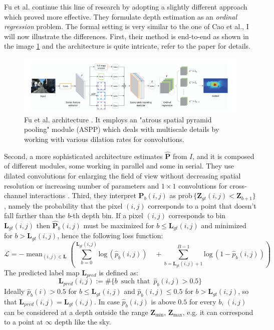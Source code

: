 Fu et al. \cite{ordinal_regression} continue this line of research by adopting a slightly different approach which proved more effective.
They formulate depth estimation as an \textit{ordinal regression} problem.
The formal setting is very similar to the one of Cao et al., I will now illustrate the differences.
First, their method is end-to-end as shown in the image \ref{fig:Fu_ordinal} and the architecture is quite intricate, refer to the paper \cite{ordinal_regression} for details.

\begin{figure}
	\centering
	\includegraphics[scale=0.5]{figs/Fu_ordinal}
	\caption{Fu et al. architecture \cite{ordinal_regression}. It employs an "atrous spatial pyramid pooling" module (ASPP) which deals with multiscale details by working with various dilation rates for convolutions. \label{fig:Fu_ordinal}}
\end{figure}

Second, a more sophisticated architecture estimates $\hat{\mathbf{P}}$ from $I$, and it is composed of different modules, some working in parallel and some in serial.
They use dilated convolutions for enlarging the field of view without decreasing spatial resolution or increasing number of parameters \cite{ordinal_regression} and $1 \times 1$ convolutions for cross-channel interactions \cite{ordinal_regression}.
Third, they interpret $\mathbf{P}_{b}(i,j)$ as $\text{prob} \, \{ \mathbf{Z}_{gt}(i,j) < \mathbf{Z}_{b+1} \}$, namely the probability that the pixel $(i,j)$ corresponds to a point that doesn't fall farther than the $b$-th depth bin.
If a pixel $(i,j)$ corresponds to bin $\mathbf{L}_{gt}(i,j)$ then $\hat{\mathbf{P}}_{b}(i,j)$ must be maximized for $b \leq \mathbf{L}_{gt}(i,j)$ and minimized for $b > \mathbf{L}_{gt}(i,j)$, hence the following loss function:
\[
	\mathcal{L} = - \mathop{\text{mean}}_{(i,j) \in \mathbf{L}} \left(
		\sum_{b=0}^{\mathbf{L}_{gt}(i,j)} \text{log} \,( \hat{p}_{b}(i,j)) \quad +
		\sum_{b=\mathbf{L}_{gt}(i,j) + 1}^{B-1} \text{log} \, (1 - \hat{p}_{b}(i,j))
		\right)
\]
The predicted label map $\mathbf{L}_{pred}$ is defined as:
\[
	\mathbf{L}_{pred}(i,j) := \# \{b \, \text{ such that } \, \hat{p}_{b}(i,j) > 0.5\}
\]
Ideally $\hat{p}_{b}(i) > 0.5$ for $b \leq \mathbf{L}_{gt}(i,j)$ and $\hat{p}_{b}(i,j) \leq 0.5$ for $b > \mathbf{L}_{gt}(i,j)$, so that $\mathbf{L}_{pred}(i,j) = \mathbf{L}_{gt}(i,j)$.
In case $\hat{p}_{b}(i,j)$ is above $0.5$ for every $b$, $(i,j)$ can be considered at a depth outside the range $\mathbf{Z}_{\text{min}}$, $\mathbf{Z}_{\text{max}}$, e.g. it can correspond to a point at $\infty$ depth like the sky.

